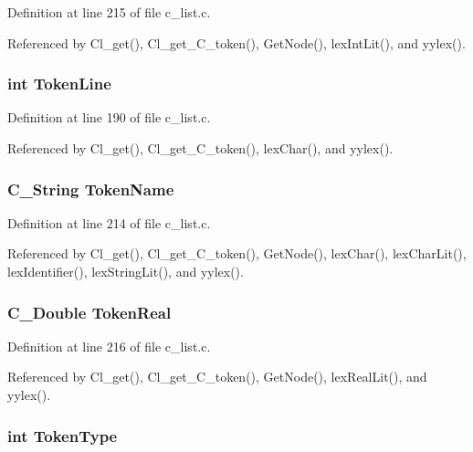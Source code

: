Definition at line 215 of file c\_\-list.c.

Referenced by Cl\_\-get(), Cl\_\-get\_\-C\_\-token(), Get\-Node(), lex\-Int\-Lit(), and yylex().
\subsubsection{\setlength{\rightskip}{0pt plus 5cm}int \bf{Token\-Line}\hspace{0.3cm}{\tt  [static]}}\label{c__list_8c_d6fa156fdabc86d658f5c9224e5fe8af}




Definition at line 190 of file c\_\-list.c.

Referenced by Cl\_\-get(), Cl\_\-get\_\-C\_\-token(), lex\-Char(), and yylex().
\subsubsection{\setlength{\rightskip}{0pt plus 5cm}\bf{C\_\-String} \bf{Token\-Name}\hspace{0.3cm}{\tt  [static]}}\label{c__list_8c_aaa0f58e9becfb6dd880416d8999a231}




Definition at line 214 of file c\_\-list.c.

Referenced by Cl\_\-get(), Cl\_\-get\_\-C\_\-token(), Get\-Node(), lex\-Char(), lex\-Char\-Lit(), lex\-Identifier(), lex\-String\-Lit(), and yylex().
\subsubsection{\setlength{\rightskip}{0pt plus 5cm}\bf{C\_\-Double} \bf{Token\-Real}\hspace{0.3cm}{\tt  [static]}}\label{c__list_8c_cb9eabb95826ccd7feefb725f081a306}




Definition at line 216 of file c\_\-list.c.

Referenced by Cl\_\-get(), Cl\_\-get\_\-C\_\-token(), Get\-Node(), lex\-Real\-Lit(), and yylex().
\subsubsection{\setlength{\rightskip}{0pt plus 5cm}int \bf{Token\-Type}\hspace{0.3cm}{\tt  [static]}}\label{c__list_8c_58872325a7ea09786c3253d71a4ea503}





